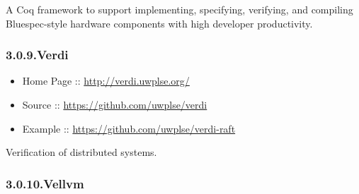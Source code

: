 \documentclass[12pt,twoside]{article}
\begin{document}
\noindent{}A Coq framework to support implementing, specifying, verifying, and
compiling Bluespec-style hardware components with high developer
productivity.%

\subsubsection{3.0.9.\hspace*{0.5em}Verdi}\label{sec-verdi}%

\begin{itemize}[noitemsep,topsep=\mdcompacttopsep]%

\item{}Home Page :: \href{http://verdi.uwplse.org/}{{\ttfamily http://\hspace{0pt}verdi.\hspace{0pt}uwplse.\hspace{0pt}org/\hspace{0pt}}}%

\item{}Source :: \href{https://github.com/uwplse/verdi}{{\ttfamily https://\hspace{0pt}github.\hspace{0pt}com/\hspace{0pt}uwplse/\hspace{0pt}verdi}}%

\item{}Example :: \href{https://github.com/uwplse/verdi-raft}{{\ttfamily https://\hspace{0pt}github.\hspace{0pt}com/\hspace{0pt}uwplse/\hspace{0pt}verdi-\hspace{0pt}raft}}%
\end{itemize}%

\noindent{}Verification of distributed systems.%

\subsubsection{3.0.10.\hspace*{0.5em}Vellvm}\label{sec-vellvm}%
\end{document}

